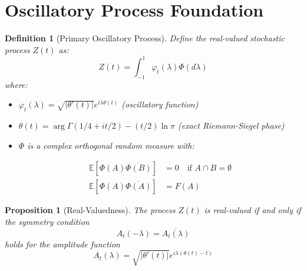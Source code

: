 \documentclass{article}
\newtheorem{definition}{Definition}
\newtheorem{proposition}{Proposition}
{\theorembodyfont{\rmfamily}\newtheorem{remark}{Remark}}
\begin{document}
\section{Oscillatory Process Foundation}

\begin{definition}
  [Primary Oscillatory Process] Define the real-valued stochastic process $Z
  (t)$ as:
  \begin{equation}
    Z (t) = \int_{- 1}^1 \varphi_t (\lambda) \Phi (d \lambda)
  \end{equation}
  where:
  \begin{itemize}
    \item $\varphi_t (\lambda) = \sqrt{| \theta' (t) |} e^{i \lambda \theta
    (t)}$ (oscillatory function)
    
    \item $\theta (t) = \arg \Gamma (1 / 4 + it / 2) - (t / 2) \ln \pi$ (exact
    Riemann-Siegel phase)
    
    \item $\Phi$ is a complex orthogonal random measure with:
    
    \begin{align}
      \mathbb{E} [\Phi (A) \overline{\Phi (B)}] & = 0 \quad \text{if } A \cap
      B = \emptyset \\
      \mathbb{E} [\Phi (A) \overline{\Phi (A)}] & = F (A) 
    \end{align}
  \end{itemize}
\end{definition}

\begin{proposition}
  [Real-Valuedness] The process $Z (t)$ is real-valued if and only if the
  symmetry condition
  \begin{equation}
    A_t  (- \lambda) = \overline{A_t (\lambda)}
  \end{equation}
  holds for the amplitude function
  \begin{equation}
    A_t (\lambda) = \sqrt{| \theta' (t) |} e^{i \lambda (\theta (t) - t)}
  \end{equation}
\end{proposition}
\end{document}
